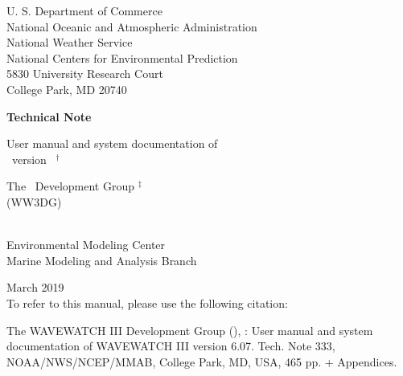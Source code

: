 
\pagestyle{empty}

\begin{center} 
U. S. Department of Commerce \\
National Oceanic and Atmospheric Administration \\
National Weather Service \\
National Centers for Environmental Prediction \\
5830 University Research Court \\
College Park, MD 20740


\vspace{15mm}

{\bf Technical Note}

\vspace{15mm}

{\large User manual and system documentation of \\
\ww\ version \WWver\ $^\dag$} \\

\vspace{15mm}

The \ww\ Development Group $^\ddag$ \\
(WW3DG)\\
\strut \\
Environmental Modeling Center \\
Marine Modeling and Analysis Branch

\vfill

 March 2019 \\
\vspace{\baselineskip}
{\sc To refer to this manual, please use the following citation:} \\
\end{center}
\noindent The WAVEWATCH III\textsuperscript{\textregistered} Development Group (), \citeyearpar{ww3man2019}: User manual and system documentation of  WAVEWATCH III\textsuperscript{\textregistered} version 6.07. Tech. Note 333, NOAA/NWS/NCEP/MMAB, College Park, MD, USA, 465 pp. + Appendices. 

